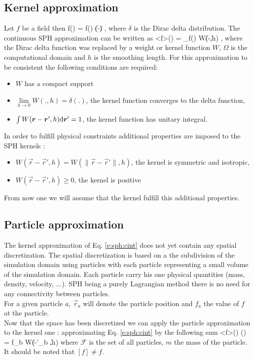\documentclass{../GPUSPHtemplate}
\begin{document}
\subsection{Kernel approximation}
Let $f$ be a field then
\be
f() = \int f() \delta(\|-\|) \td {},
\label{e:sph:delta}
\en
where $\delta$ is the Dirac delta distribution. The continuous SPH
approximation can be written as
\be
<f>() = \int_\Omega f() W(\|-\|,h) \td {},
\label{e:sph:cint}
\en
where the Dirac delta function was replaced by a weight or kernel
function $W$, $\Omega$ is the computational domain and $h$ is the
smoothing length. 
For this approximation to be consistent the following conditions are required:
\begin{itemize}
\item $W$ has a compact support
\item $\underset{h\rightarrow 0}{\lim} W(.,h) = \delta(.)$, \ie the
kernel function converges to the delta function,
\item $\int W(\bm{r}-\bm{r}',h) \text{d} \bm{r}' = 1$, \ie the kernel function has unitary
integral.
\end{itemize}
In order to fulfill physical constraints additional properties are imposed to the SPH kernels :
\begin{itemize}
\item $W(\vec{r}-\vec{r}',h) = W(\| \vec{r}-\vec{r}' \|,h)$, \ie the kernel is symmetric and isotropic,
\item  $W(\vec{r}-\vec{r}',h) \geq 0$, \ie the kernel is positive
\end{itemize}
From now one we will assume that the kernel fulfill this additional properties.

\subsection{Particle approximation}
The kernel approximation of Eq. \eqref{e:sph:cint} does not yet
contain any spatial discretization. The spatial discretization is based on a
the subdivision of the simulation domain using particles with each particle 
representing  a small volume of the simulation domain. Each particle carry his 
one physical quantities (mass, density, velocity, ...). SPH being a purely Lagrangian
method there is no need for any connectivity between particles.\\
For a given particle $a$, $\vec{r}_a$ will denote the particle position and $f_a$ the 
value of $f$ at the particle.\\
Now that the space has been discretized we can apply the particle approximation to the
kernel one : approximating Eq. \eqref{e:sph:cint} by the following sum
\be
<f>() \approx [f]() =  { f_b W(\| -'_b \|,h)}
\label{e:sph:int}
\en
where $\mathcal{F}$ is the set of all particles, $m$ the mass of the particle. It should be noted that
$[f] \neq f$.
\end{document}
